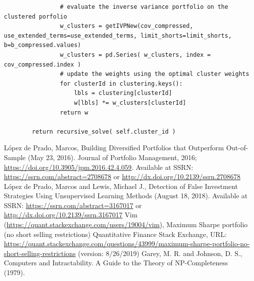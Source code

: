 \documentclass[10pt,twoside,titlepage]{article}   %
\begin{document}
\begin{lstlisting}
                # evaluate the inverse variance portfolio on the clustered porfolio
                w_clusters = getIVPNew(cov_compressed, use_extended_terms=use_extended_terms, limit_shorts=limit_shorts, b=b_compressed.values)
                w_clusters = pd.Series( w_clusters, index = cov_compressed.index )
                # update the weights using the optimal cluster weights
                for clusterId in clustering.keys():
                    lbls = clustering[clusterId]
                    w[lbls] *= w_clusters[clusterId]
                return w

        return recursive_solve( self.cluster_id )
\end{lstlisting}

\begin{thebibliography}{9}
L\'opez de Prado, Marcos, Building Diversified Portfolios that Outperform Out-of-Sample (May 23, 2016). Journal of Portfolio Management, 2016; \url{https://doi.org/10.3905/jpm.2016.42.4.059}. 
Available at SSRN: \url{https://ssrn.com/abstract=2708678} or \url{http://dx.doi.org/10.2139/ssrn.2708678}
L\'opez de Prado, Marcos and Lewis, Michael J., Detection of False Investment Strategies Using Unsupervised Learning Methods (August 18, 2018). 
Available at SSRN: \url{https://ssrn.com/abstract=3167017} or \url{http://dx.doi.org/10.2139/ssrn.3167017}
Vim (\url{https://quant.stackexchange.com/users/19004/vim}), Maximum Sharpe portfolio (no short selling restrictions) 
Quantitative Finance Stack Exchange, URL: \url{https://quant.stackexchange.com/questions/43999/maximum-sharpe-portfolio-no-short-selling-restrictions} (version: 8/26/2019)
Garey, M. R. and Johnson, D. S., Computers and Intractability. A Guide to the Theory of NP-Completeness (1979).
\end{thebibliography}
\end{document}
